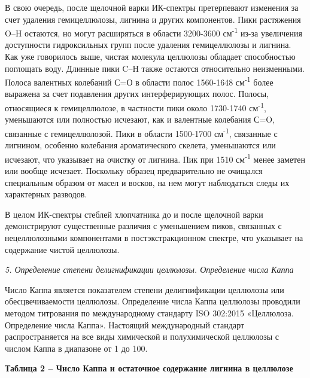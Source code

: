 В свою очередь, после щелочной варки ИК-спектры претерпевают изменения
за счет удаления гемицеллюлозы, лигнина и других компонентов. Пики
растяжения O--H остаются, но могут расширяться в области 3200-3600
см\textsuperscript{-1} из-за увеличения доступности гидроксильных групп
после удаления гемицеллюлозы и лигнина. Как уже говорилось выше, чистая
молекула целлюлозы обладает способностью поглощать воду. Длинные пики
C--H также остаются относительно неизменными. Полоса валентных колебаний
С=О в области полос 1560-1648 см\textsuperscript{-1} более выражена за
счет подавления других интерферирующих полос. Полосы, относящиеся к
гемицеллюлозе, в частности пики около 1730-1740 см\textsuperscript{-1},
уменьшаются или полностью исчезают, как и валентные колебания С=O,
связанные с гемицеллюлозой. Пики в области 1500-1700
см\textsuperscript{-1}, связанные с лигнином, особенно колебания
ароматического скелета, уменьшаются или исчезают, что указывает на
очистку от лигнина. Пик при 1510 см\textsuperscript{-1} менее заметен
или вообще исчезает. Поскольку образец предварительно не очищался
специальным образом от масел и восков, на нем могут наблюдаться следы их
характерных разводов.

В целом ИК-спектры стеблей хлопчатника до и после щелочной варки
демонстрируют существенные различия с уменьшением пиков, связанных с
нецеллюлозными компонентами в постэкстракционном спектре, что указывает
на содержание чистой целлюлозы.

\emph{5. Определение степени делигнификации целлюлозы. Определение числа
Каппа}

Число Каппа является показателем степени делигнификации целлюлозы или
обесцвечиваемости целлюлозы. Определение числа Каппа целлюлозы проводили
методом титрования по международному стандарту ISO 302:2015 «Целлюлоза.
Определение числа Каппа». Настоящий международный стандарт
распространяется на все виды химической и полухимической целлюлозы с
числом Каппа в диапазоне от 1 до 100.

{\bfseries Таблица 2 -- Число Каппа и остаточное содержание лигнина в
целлюлозе}

